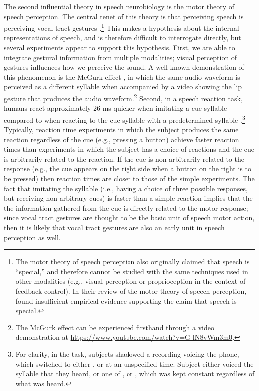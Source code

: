 The second influential theory
in speech neurobiology is the
motor theory of speech perception.
The central tenet of this theory
is that perceiving speech
is perceiving vocal tract gestures
\citep{liberman1985,galantucci2006}.\footnote{
  The motor theory of speech perception also
  originally claimed that speech is ``special,''
  and therefore cannot be studied with
  the same techniques used in other modalities
  (e.g., visual perception or
  proprioception in the context of feedback control).
  In their review of the motor theory of speech perception,
  \citet{galantucci2006} found insufficient empirical evidence
  supporting the claim that speech is special.}
This makes a hypothesis about
the internal representations of speech,
and is therefore difficult
to interrogate directly,
but several experiments appear
to support this hypothesis.
First, we are able to integrate
gestural information from multiple modalities;
visual perception of gestures
influences how we perceive the sound.
A well-known demonstration of
this phenomenon is the McGurk effect
\citep{mcgurk1976},
in which the same audio waveform
is perceived as a different syllable
when accompanied by a video
showing the lip gesture that produces
the audio waveform.\footnote{
  The McGurk effect can be experienced firsthand through
  a video demonstration at
  \url{https://www.youtube.com/watch?v=G-lN8vWm3m0}.}
Second, in a speech reaction task,
humans react approximately 26 ms quicker
when imitating a cue syllable
compared to when reacting
to the cue syllable
with a predetermined syllable
\citep{fowler2003}.\footnote{
  For clarity, in the task, subjects
  shadowed a recording voicing the \ipa{[A]} phone,
  which switched to either \ipa{[pA]}, \ipa{[tA]} or \ipa{[kA]} at an
  unspecified time.
  Subject either voiced the syllable that they heard,
  or one of \ipa{[pA]}, \ipa{[tA]} or \ipa{[kA]},
  which was kept constant regardless of what was heard.}
Typically, reaction time experiments
in which the subject produces the same reaction
regardless of the cue (e.g., pressing a button)
achieve faster reaction times
than experiments in which the subject
has a choice of reactions
and the cue is arbitrarily related
to the reaction.
If the cue is non-arbitrarily related
to the response
(e.g., the cue appears on the right side
when a button on the right is to be pressed)
then reaction times are closer to those
of the simple experiments.
The fact that imitating the syllable
(i.e., having a choice of three possible responses,
but receiving non-arbitrary cues)
is faster than a simple reaction
implies that the the information gathered
from the cue is directly related
to the motor response;
since vocal tract gestures are thought
to be the basic unit of speech motor action,
then it is likely that vocal tract gestures
are also an early unit
in speech perception as well.


